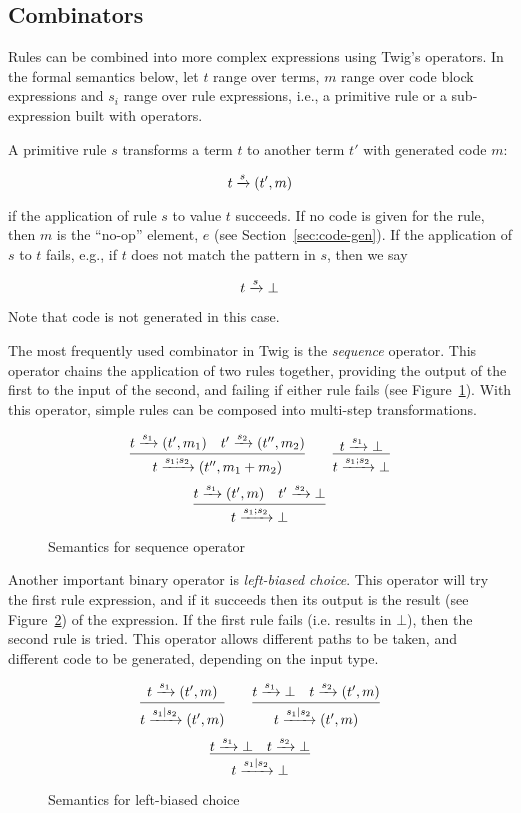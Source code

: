 \subsection{Combinators}

Rules can be combined into more complex expressions using Twig's operators. In the formal semantics below, let $t$ range over terms, $m$ range over code block expressions and $s_i$ range over rule expressions, i.e., a primitive rule or a sub-expression built with operators.

A primitive rule $s$ transforms a term $t$ to another term $t'$ with generated code $m$:

\[
t \xrightarrow{s} (t',m)
\]

if the application of rule $s$ to value $t$ succeeds. If no code is given for the rule, then $m$ is the ``no-op'' element, $e$ (see Section~\ref{sec:code-gen}). If the application of $s$ to $t$ fails, e.g., if $t$ does not match the pattern in $s$, then we say

\[
t \xrightarrow{s} \bot
\]

Note that code is not generated in this case.

The most frequently used combinator in Twig is the \emph{sequence} operator. This operator chains the application of two rules together, providing the output of the first to the input of the second, and failing if either rule fails (see Figure~\ref{semantics:sequence}). With this operator, simple rules can be composed into multi-step transformations.

\begin{figure}[ht]
\label{semantics:sequence}
\[
\infer{t \arr{s_1;s_2} (t'',m_1+m_2)}{t \arr{s_1} (t',m_1) \quad t' \arr{s_2} (t'',m_2)}
\qquad 
\infer{t \arr{s_1;s_2} \bot}{t \arr{s_1} \bot}
\]
\[
\infer{t \arr{s_1;s_2} \bot}{t \arr{s_1} (t',m) \quad t' \arr{s_2} \bot}
\]
\caption{Semantics for sequence operator}
\end{figure}

Another important binary operator is \emph{left-biased choice}. This operator will try the first rule expression, and if it succeeds then its output is the result (see Figure~\ref{semantics:choice}) of the expression. If the first rule fails (i.e. results in $\bot$), then the second rule is tried. This operator allows different paths to be taken, and different code to be generated, depending on the input type.

\begin{figure}[ht]
\label{semantics:choice}
\[
\infer{t \arr{s_1|s_2} (t',m)}{t \arr{s_1} (t',m)}
\qquad 
\infer{t \arr{s_1|s_2} (t',m)}{t \arr{s_1} \bot \quad t \arr{s_2} (t',m)}
\]
\[
\infer{t \arr{s_1|s_2} \bot}{t \arr{s_1} \bot \quad t \arr{s_2} \bot}
\]
\caption{Semantics for left-biased choice}
\end{figure}


